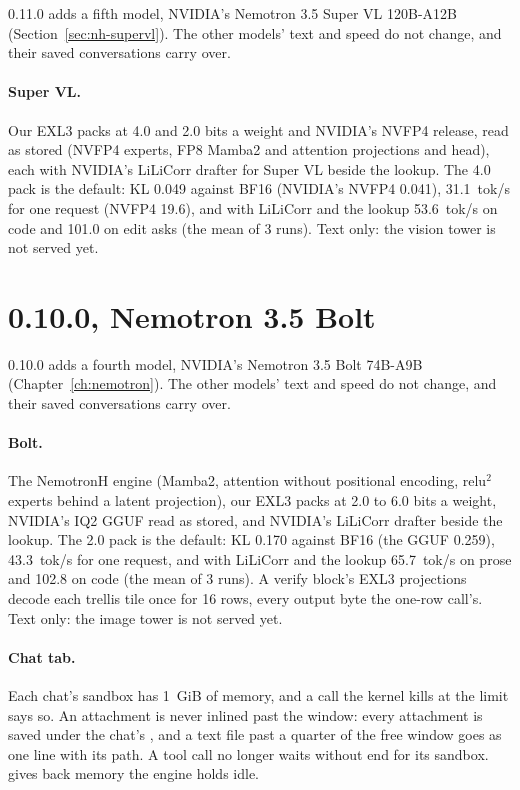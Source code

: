 0.11.0 adds a fifth model, NVIDIA's Nemotron 3.5 Super VL 120B-A12B (Section~\ref{sec:nh-supervl}). The other models' text and speed do not change, and their saved conversations carry over.

\paragraph{Super VL.} Our EXL3 packs at 4.0 and 2.0 bits a weight and NVIDIA's NVFP4 release, read as stored (NVFP4 experts, FP8 Mamba2 and attention projections and head), each with NVIDIA's LiLiCorr drafter for Super VL beside the lookup. The 4.0 pack is the default: KL 0.049 against BF16 (NVIDIA's NVFP4 0.041), 31.1~tok/s for one request (NVFP4 19.6), and with LiLiCorr and the lookup 53.6~tok/s on code and 101.0 on edit asks (the mean of 3 runs). Text only: the vision tower is not served yet.

\section{0.10.0, Nemotron 3.5 Bolt}\label{sec:changelog-0100}

0.10.0 adds a fourth model, NVIDIA's Nemotron 3.5 Bolt 74B-A9B (Chapter~\ref{ch:nemotron}). The other models' text and speed do not change, and their saved conversations carry over.

\paragraph{Bolt.} The NemotronH engine (Mamba2, attention without positional encoding, relu$^2$ experts behind a latent projection), our EXL3 packs at 2.0 to 6.0 bits a weight, NVIDIA's IQ2 GGUF read as stored, and NVIDIA's LiLiCorr drafter beside the lookup. The 2.0 pack is the default: KL 0.170 against BF16 (the GGUF 0.259), 43.3~tok/s for one request, and with LiLiCorr and the lookup 65.7~tok/s on prose and 102.8 on code (the mean of 3 runs). A verify block's EXL3 projections decode each trellis tile once for 16 rows, every output byte the one-row call's. Text only: the image tower is not served yet.

\paragraph{Chat tab.} Each chat's sandbox has 1~GiB of memory, and a call the kernel kills at the limit says so. An attachment is never inlined past the window: every attachment is saved under the chat's , and a text file past a quarter of the free window goes as one line with its path. A tool call no longer waits without end for its sandbox.  gives back memory the engine holds idle.

